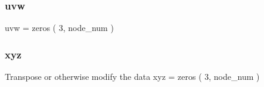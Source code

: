 \subsubsection{\texorpdfstring{uvw}{uvw}}
{\footnotesize\ttfamily uvw = zeros ( 3, node\+\_\+num )}

\mbox{\label{a00614_a534015daa58c291db01fdaa6ea94b267}} 
\subsubsection{\texorpdfstring{xyz}{xyz}}
{\footnotesize\ttfamily Transpose or otherwise modify the data xyz = zeros ( 3, node\+\_\+num )}

